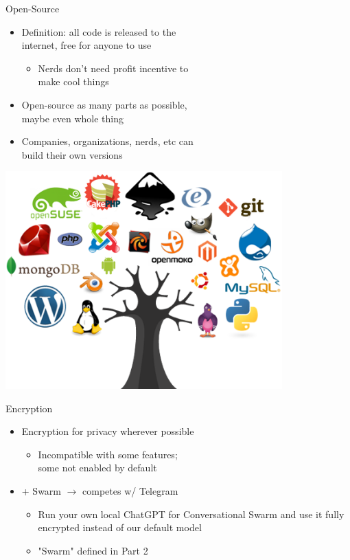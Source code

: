 \documentclass[aspectratio=35]{beamer} %
\begin{document}
\begin{frame}{Open-Source}
\vspace{-0.7in}
\begin{itemize}
    \item Definition: all code is released to the\\internet, free for anyone to use
    \begin{itemize}
        \item Nerds don't need profit incentive to\\make cool things
    \end{itemize}
    \item Open-source as many parts as possible,\\maybe even whole thing
    \item Companies, organizations, nerds, etc can\\build their own versions
\end{itemize}
\centering
\includegraphics[width=0.8\textwidth]{imgs/power_to_people/open-source.png}
\end{frame}

\begin{frame}{Encryption}
\vspace{-1.4in}
\begin{itemize}
    \item Encryption for privacy wherever possible
    \begin{itemize}
        \item Incompatible with some features;\\some not enabled by default
    \end{itemize}
    \item {} + Swarm $\rightarrow$ competes w/ Telegram
    \begin{itemize}
        \item Run your own local ChatGPT for Conversational Swarm and use it fully encrypted instead of our default model
        \item "Swarm" defined in Part 2
    \end{itemize}
\end{itemize}
\end{frame}
\end{document}
